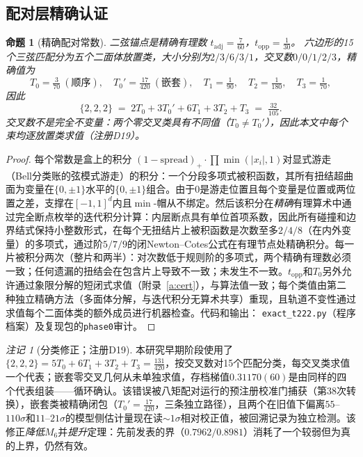 \documentclass[11pt]{article}
\numberwithin{equation}{section}
\newtheorem{proposition}[theorem]{命题}
\theoremstyle{definition}
\theoremstyle{remark}
\newtheorem{remark}[theorem]{注记}
\begin{document}
\subsection{配对层精确认证}\label{s:five:cert}

\begin{proposition}[精确配对常数]\label{p:t222}
二弦锚点是精确有理数
$t_{\mathrm{adj}}=\tfrac7{60}$，$t_{\mathrm{opp}}=\tfrac1{30}$。
六边形的15个三弦匹配分为\emph{五个}二面体放置类，大小分别为$2/3/6/3/1$，交叉数$0/0/1/2/3$，精确值为
\[
T_0=\tfrac3{70}\ (\text{顺序}),\quad
T_0'=\tfrac{17}{420}\ (\text{嵌套}),\quad
T_1=\tfrac1{90},\quad T_2=\tfrac1{180},\quad T_3=\tfrac1{70},
\]
因此
\[
\{2,2,2\}\;=\;2T_0+3T_0'+6T_1+3T_2+T_3\;=\;\tfrac{32}{105}.
\]
交叉数\emph{不是}完全不变量：两个零交叉类具有不同值（$T_0\ne T_0'$），因此本文中每个束均逐放置类求值（注册D19）。
\end{proposition}

\begin{proof}
每个常数是盒上的积分
$(1-\mathrm{spread})_+\cdot\prod\min(|x_i|,1)$对显式游走（Bell分类账的弦模式游走）的积分：一个分段多项式被积函数，其所有扭结超曲面为变量在$\{0,\pm1\}$水平的$\{0,\pm1\}$组合。由于0是游走位置且每个变量是位置或两位置之差，支撑在$[-1,1]^d$内且$\min$-帽从不绑定。然后该积分在\emph{精确}有理算术中通过完全断点枚举的迭代积分计算：内层断点具有单位首项系数，因此所有碰撞和边界结式保持小整数形式，在每个无扭结片上被积函数是次数至多$2/4/8$（在内外变量）的多项式，通过阶$5/7/9$的闭Newton--Cotes公式在有理节点处精确积分。每一片被积分两次（整片和两半）：对次数低于规则阶的多项式，两个精确有理数必须一致；任何遗漏的扭结会在包含片上导致不一致；未发生不一致。$t_{\mathrm{opp}}$和$T_0$另外允许通过象限分解的短闭式求值（附录~\ref{a:cert}），与算法值一致；每个类值由第二种独立精确方法（多面体分解，与迭代积分无算术共享）重现，且轨道不变性通过求值每个二面体类的额外成员进行机器检查。代码和输出：
\texttt{exact\_t222.py}（程序档案）及复现包的\texttt{phase0}审计。
\end{proof}

\begin{remark}[分类修正；注册D19]\label{r:d19}
本研究早期阶段使用了$\{2,2,2\}=5T_0+6T_1+3T_2+T_3=\tfrac{131}{420}$，按交叉数对15个匹配分类，每交叉类求值一个代表；嵌套零交叉几何从未单独求值，存档梯值$0.31170(60)$是由同样的四个代表组装——循环确认。该错误被八矩配对运行的预注册校准门捕获（第38次转换），嵌套类被精确闭包（$T_0'=\tfrac{17}{420}$，三条独立路径），且两个在旧值下偏离$55$--$110\sigma$和$11$--$21\sigma$的模型侧估计量现在读$\sim1\sigma$相对校正值，被回溯记录为独立检测。该修正\emph{降低}$M_6$并\emph{提升}定理：先前发表的界（$0.7962/0.8981$）消耗了一个较弱但为真的上界，仍然有效。
\end{remark}
\end{document}
